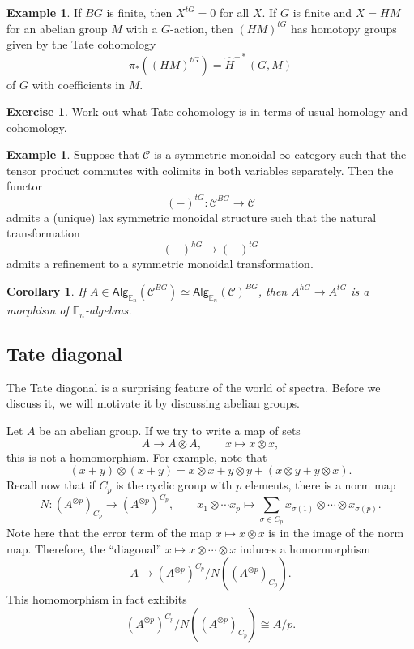 \documentclass[10pt]{amsart}
\newtheorem{cor}[thm]{Corollary}
\theoremstyle{definition}
\newtheorem{exm}[thm]{Example}
\newtheorem{exer}[thm]{Exercise}
\theoremstyle{remark}
\theoremstyle{plain}
\theoremstyle{definition}
\theoremstyle{remark}
\newcommand{\E}{\mathbb{E}}
\newcommand{\mc}[1]{\mathcal{#1}}
\newcommand{\ms}[1]{\mathsf{#1}}
\newcommand{\1}{\mathbf{1}}
\newcommand{\2}{\mathbf{2}}
\newcommand{\3}{\mathbf{3}}
\begin{document}
\begin{exm}
    If $BG$ is finite, then $X^{tG} = 0$ for all $X$. If $G$ is finite and $X = HM$ for an abelian group $M$ with a $G$-action, then $(HM)^{tG}$ has homotopy groups given by the Tate cohomology
    \[ \pi_* ((HM)^{tG}) = \hat{H}^{-*}(G, M) \]
    of $G$ with coefficients in $M$.
\end{exm}

\begin{exer}
    Work out what Tate cohomology is in terms of usual homology and cohomology.
\end{exer}

\begin{exm}
    Suppose that $\mc{C}$ is a symmetric monoidal $\infty$-category such that the tensor product commutes with colimits in both variables separately. Then the functor
    \[ (-)^{tG} \colon \mc{C}^{BG} \to \mc{C} \]
    admits a (unique) lax symmetric monoidal structure such that the natural transformation
    \[ (-)^{hG} \to (-)^{tG} \]
    admits a refinement to a symmetric monoidal transformation.
\end{exm}

\begin{cor}
    If $A \in \ms{Alg}_{\E_n}(\mc{C}^{BG}) \simeq \ms{Alg}_{\E_n}(\mc{C})^{BG}$, then $A^{hG} \to A^{tG}$ is a morphism of $\E_n$-algebras.
\end{cor}

\subsection{Tate diagonal}%
\label{sub:Tate diagonal}

The Tate diagonal is a surprising feature of the world of spectra. Before we discuss it, we will motivate it by discussing abelian groups.

Let $A$ be an abelian group. If we try to write a map of sets
\[ A \to A \otimes A, \qquad x \mapsto x\otimes x, \]
this is not a homomorphism. For example, note that
\[ (x+y) \otimes (x+y) = x \otimes x + y \otimes y + (x\otimes y + y \otimes x). \]
Recall now that if $C_p$ is the cyclic group with $p$ elements, there is a norm map
\[ N \colon (A^{\otimes p})_{C_p} \to (A^{\otimes p})^{C_p}, \qquad x_1 \otimes \cdots x_p \mapsto \sum_{\sigma \in C_p} x_{\sigma(1)} \otimes \cdots \otimes x_{\sigma(p)}. \]
Note here that the error term of the map $x \mapsto x \otimes x$ is in the image of the norm map. Therefore, the ``diagonal'' $x \mapsto x \otimes \cdots \otimes x$ induces a homormorphism
\[ A \to (A^{\otimes p})^{C_p}/N((A^{\otimes p})_{C_p}). \]
This homomorphism in fact exhibits
\[ (A^{\otimes p})^{C_p} / N((A^{\otimes p})_{C_p}) \cong A/p. \]
\end{document}
